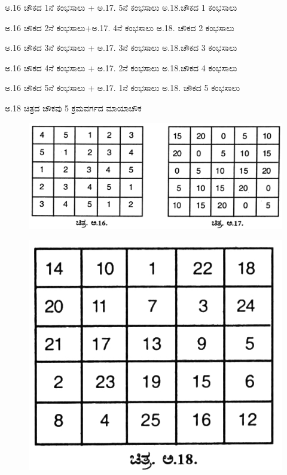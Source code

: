 \smallskip
\noindent ಅ.16 ಚೌಕದ 1ನೆ ಕಂಭಸಾಲು + ಅ.17. 5ನೆ ಕಂಭಸಾಲು ಅ.18.ಚೌಕದ 1 ಕಂಭಸಾಲು

\smallskip
\noindent ಅ.16 ಚೌಕದ 2ನೆ ಕಂಭಸಾಲು+ಅ.17. 4ನೆ ಕಂಭಸಾಲು ಅ.18. ಚೌಕದ 2 ಕಂಭಸಾಲು

\smallskip
\noindent ಅ.16 ಚೌಕದ 3ನೆ ಕಂಭಸಾಲು + ಅ.17. 3ನೆ ಕಂಭಸಾಲು ಅ.18.ಚೌಕದ 3 ಕಂಭಸಾಲು

\smallskip
\noindent ಅ.16 ಚೌಕದ 4ನೆ ಕಂಭಸಾಲು + ಅ.17. 2ನೆ ಕಂಭಸಾಲು ಅ.18.ಚೌಕದ 4 ಕಂಭಸಾಲು

\smallskip
\noindent ಅ.16 ಚೌಕದ 5ನೆ ಕಂಭಸಾಲು + ಅ.17. 1ನೆ ಕಂಭಸಾಲು ಅ.18. ಚೌಕದ 5 ಕಂಭಸಾಲು

\smallskip
\noindent ಅ.18 ಚಿತ್ರದ ಚೌಕವು 5 ಕ್ರಮವರ್ಗದ ಮಾಯಾಚೌಕ
\begin{figure}[H]
\includegraphics[scale=1.15]{src/figures/chap9/fig9-12.jpg}
\end{figure}
\begin{figure}[H]
\includegraphics{src/figures/chap9/fig9-13.jpg}
\end{figure}

